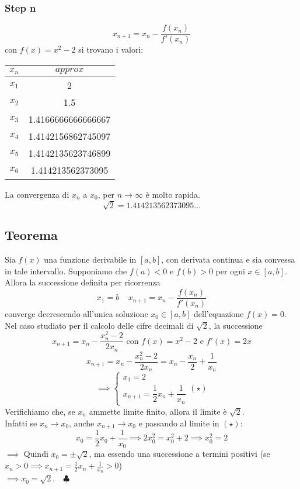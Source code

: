 \documentclass[../../main.tex]{subfiles}
\begin{document}
\subsubsection{Step n}
\[
    x_{n+1} = x_n - \dfrac{f(x_n)}{f'(x_n)}
\]
con $f(x) = x^2 - 2$ si trovano i valori:
\begin{center}
    \begin{tabular}{|c|c|}
        \hline
        $x_n$ & $approx$           \\
        \hline
        $x_1$ & 2                  \\
        $x_2$ & 1.5                \\
        $x_3$ & 1.4166666666666667 \\
        $x_4$ & 1.4142156862745097 \\
        $x_5$ & 1.4142135623746899 \\
        $x_6$ & 1.414213562373095  \\
        \hline
    \end{tabular}
\end{center}
La convergenza di $x_n$ a $x_0$, per $n\to\infty$ è molto rapida.\\
\[
    \sqrt{2} = 1.414213562373095\ldots
\]

\subsection{Teorema}
Sia $f(x)$ una funzione derivabile in $[a, b]$, con derivata continua e sia convessa in tale intervallo. Supponiamo
che $f(a) < 0$ e $f(b) > 0$ per ogni $x\in[a, b]$. Allora la successione definita per ricorrenza
\[
    x_1 = b \ \ \ \ \ x_{n+1} = x_n - \dfrac{f(x_n)}{f'(x_n)}
\]
converge decrescendo all'unica soluzione $x_0\in[a, b]$ dell'equazione $f(x) = 0$.\\
Nel caso studiato per il calcolo delle cifre decimali di $\sqrt{2}$, la successione
\[
    x_{n+1} = x_n - \dfrac{x_n^2 - 2}{2x_n} \text{ con } f(x) = x^2 - 2 \text{ e } f'(x) = 2x
\]
\[
    x_{n+1} = x_n - \dfrac{x_n^2 - 2}{2x_n} = x_n - \dfrac{x_n}{2} + \dfrac{1}{x_n}
\]
\[
    \implies \begin{cases}
        x_1 = 2 \\
        x_{n+1} = \dfrac{1}{2}x_n + \dfrac{1}{x_n}
    \end{cases}
    (\star)
\]
Verifichiamo che, se $x_n$ ammette limite finito, allora il limite è $\sqrt{2}$.\\
Infatti se $x_n \to x_0$, anche $x_{n+1} \to x_0$ e passando al limite in $(\star)$:
\[
    x_0 = \dfrac{1}{2}x_0 + \dfrac{1}{x_0} \implies 2x_0^2 = x_0^2 + 2 \implies x_0^2 = 2
\]
$\implies$ Quindi $x_0 = \pm \sqrt{2}$, ma essendo una successione a termini positivi (se $x_n > 0 \implies x_{n+1} = \frac{1}{2}x_n + \frac{1}{x_n} > 0$)\\
$\implies x_0 = \sqrt{2}$.\ \ $\clubsuit$
\end{document}
